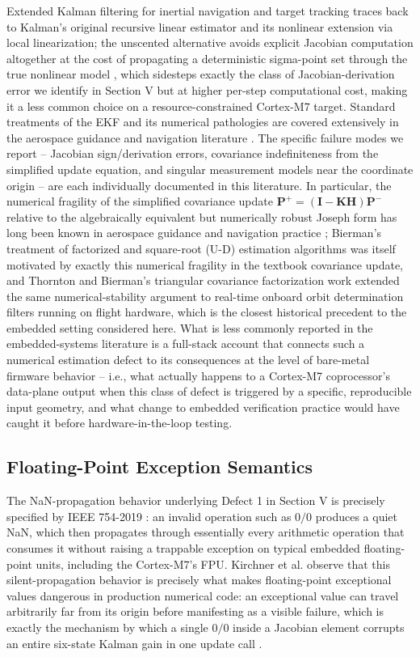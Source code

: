 \documentclass[conference]{IEEEtran}
\begin{document}
Extended Kalman filtering for inertial navigation and target tracking traces back to Kalman's original recursive linear estimator \cite{r1} and its nonlinear extension via local linearization; the unscented alternative avoids explicit Jacobian computation altogether at the cost of propagating a deterministic sigma-point set through the true nonlinear model \cite{r2}, which sidesteps exactly the class of Jacobian-derivation error we identify in Section V but at higher per-step computational cost, making it a less common choice on a resource-constrained Cortex-M7 target. Standard treatments of the EKF and its numerical pathologies are covered extensively in the aerospace guidance and navigation literature \cite{r4}. The specific failure modes we report -- Jacobian sign/derivation errors, covariance indefiniteness from the simplified update equation, and singular measurement models near the coordinate origin -- are each individually documented in this literature. In particular, the numerical fragility of the simplified covariance update $\mathbf{P}^+ = (\mathbf{I} - \mathbf{K}\mathbf{H})\mathbf{P}^-$ relative to the algebraically equivalent but numerically robust Joseph form has long been known in aerospace guidance and navigation practice \cite{r3,r4}; Bierman's treatment of factorized and square-root (U-D) estimation algorithms \cite{r3} was itself motivated by exactly this numerical fragility in the textbook covariance update, and Thornton and Bierman's triangular covariance factorization work \cite{r15} extended the same numerical-stability argument to real-time onboard orbit determination filters running on flight hardware, which is the closest historical precedent to the embedded setting considered here. What is less commonly reported in the embedded-systems literature is a full-stack account that connects such a numerical estimation defect to its consequences at the level of bare-metal firmware behavior -- i.e., what actually happens to a Cortex-M7 coprocessor's data-plane output when this class of defect is triggered by a specific, reproducible input geometry, and what change to embedded verification practice would have caught it before hardware-in-the-loop testing.

\subsection{Floating-Point Exception Semantics}

The NaN-propagation behavior underlying Defect 1 in Section V is precisely specified by IEEE 754-2019 \cite{r16}: an invalid operation such as $0/0$ produces a quiet NaN, which then propagates through essentially every arithmetic operation that consumes it without raising a trappable exception on typical embedded floating-point units, including the Cortex-M7's FPU. Kirchner et al. observe that this silent-propagation behavior is precisely what makes floating-point exceptional values dangerous in production numerical code: an exceptional value can travel arbitrarily far from its origin before manifesting as a visible failure, which is exactly the mechanism by which a single $0/0$ inside a Jacobian element corrupts an entire six-state Kalman gain in one update call \cite{r17}.
\end{document}
